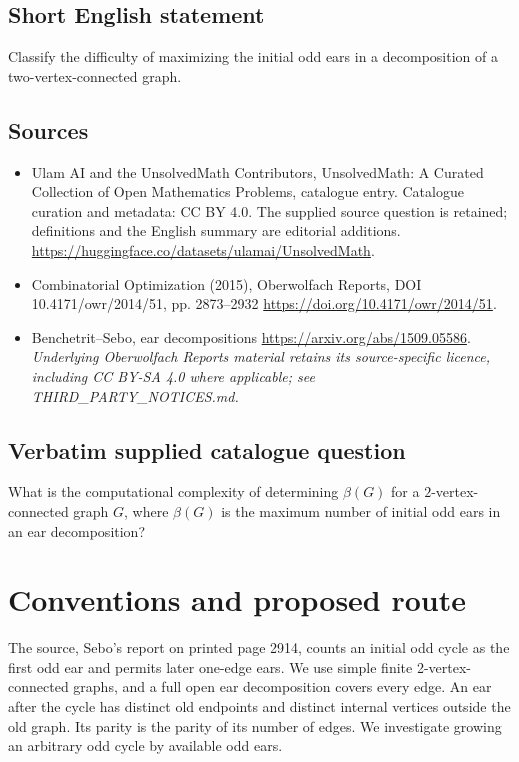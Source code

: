 \documentclass[11pt]{article}
\begin{document}
\subsection{Short English statement}
Classify the difficulty of maximizing the initial odd ears in a decomposition of a two-vertex-connected graph.
\subsection{Sources}
\begin{itemize}
\item[S1] Ulam AI and the UnsolvedMath Contributors, UnsolvedMath: A Curated Collection of Open Mathematics Problems, catalogue entry. Catalogue curation and metadata: CC BY 4.0. The supplied source question is retained; definitions and the English summary are editorial additions.
\url{https://huggingface.co/datasets/ulamai/UnsolvedMath}.
\item[S2] Combinatorial Optimization (2015), Oberwolfach Reports, DOI 10.4171/owr/2014/51, pp. 2873--2932
\url{https://doi.org/10.4171/owr/2014/51}.
\item[S3] Benchetrit--Sebo, ear decompositions
\url{https://arxiv.org/abs/1509.05586}.
\textit{Underlying Oberwolfach Reports material retains its source-specific licence, including CC BY-SA 4.0 where applicable; see THIRD\_PARTY\_NOTICES.md.}
\end{itemize}
\subsection{Verbatim supplied catalogue question}
What is the computational complexity of determining $\beta(G)$ for a $2$-vertex-connected graph $G$, where $\beta(G)$ is the maximum number of initial odd ears in an ear decomposition?

\section{Conventions and proposed route}
The source, Sebo's report on printed page 2914, counts an initial odd cycle
as the first odd ear and permits later one-edge ears. We use simple finite
2-vertex-connected graphs, and a full open ear decomposition covers every edge.
An ear after the cycle has distinct old endpoints and distinct internal vertices
outside the old graph. Its parity is the parity of its number of edges.
We investigate growing an arbitrary odd cycle by available odd ears.
\end{document}
